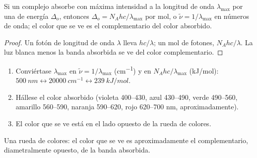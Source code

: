 \begin{proposition}\label{prop:b2:ligand-field:colour}
Si un complejo absorbe con máxima intensidad a la longitud de onda $\lambda_{\max}$ por una 
de energía $\Delta_o$, entonces $\Delta_o = N_Ahc/\lambda_{\max}$ por mol, o $\tilde\nu = 1/\lambda_{\max}$
en números de onda; el color que se ve es el complementario del color absorbido.
\end{proposition}

\begin{proof}
Un fotón de longitud de onda $\lambda$ lleva $hc/\lambda$; un mol de fotones, $N_Ahc/\lambda$. La luz
blanca menos la banda absorbida se ve del color complementario.
\end{proof}

\begin{method}\label{met:b2:ligand-field:colour}
\begin{enumerate}
  \item Conviértase $\lambda_{\max}$ en $\tilde\nu = 1/\lambda_{\max}$ (\unit{cm^{-1}}) y en
        $N_Ahc/\lambda_{\max}$ (\unit{kJ/mol}): $\qty{500}{nm} \leftrightarrow \qty{20000}{cm^{-1}}
        \leftrightarrow \qty{239}{kJ/mol}$.
  \item Hállese el color absorbido (violeta 400--430, azul 430--490, verde 490--560, amarillo
        560--590, naranja 590--620, rojo 620--700 nm, aproximadamente).
  \item El color que se ve está en el lado opuesto de la rueda de colores.
\end{enumerate}
\end{method}

\begin{omfigure}

{\small Una rueda de colores: el color que se ve es aproximadamente el complementario, diametralmente
opuesto, de la banda absorbida.}
\end{omfigure}

